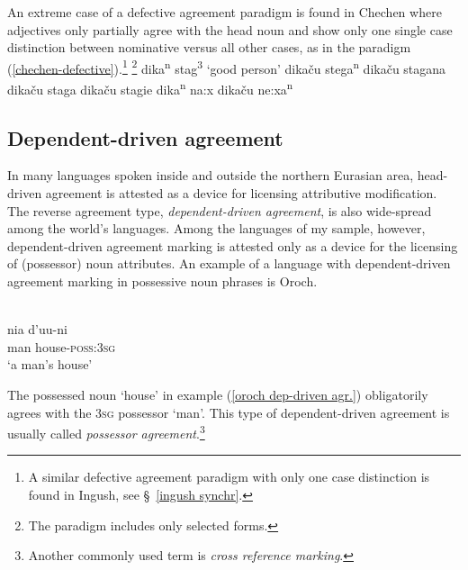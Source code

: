 An extreme case of a defective agreement paradigm is found in Chechen where adjectives only partially agree with the head noun and show only one single case distinction between nominative versus all other cases, as in the paradigm (\ref{chechen-defective}).\footnote{A similar defective agreement paradigm with only one case distinction is found in Ingush, see \S~\ref{ingush synchr}.}
\ea
\label{chechen-defective}
\footnote{The paradigm includes only selected forms.}
\ea dika\textsuperscript{n} stag\textsuperscript{3} \rm{‘good person’}		
\ex dikaču stega\textsuperscript{n} 								
\ex dikaču stagana 											
\ex dikaču staga 											
\ex dikaču stagie											
\ex dika\textsuperscript{n} na:x									
\ex dikaču ne:xa\textsuperscript{n}								
\zl
{}

\subsection{Dependent-driven agreement}
In many languages spoken inside and outside the northern Eurasian area, head\hyp{}driven agreement is attested as a device for licensing attributive modification. The reverse agreement type, \emph{dependent-driven agreement}, is also wide-spread among the world's languages. Among the languages of my sample, however, dependent-driven agreement marking is attested only as a device for the licensing of (possessor) noun attributes. An example of a language with dependent-driven agreement marking in possessive noun phrases is Oroch.
\begin{exe}
\ex
\label{oroch dep-driven agr.}
\\
\gll 	nia	d'uu-ni\\
	man	house-\textsc{poss:3sg}\\
\glt	‘a man's house’
\end{exe}
The possessed noun ‘house’ in example (\ref{oroch dep-driven agr.}) obligatorily agrees with the \textsc{3sg} possessor ‘man’. This type of dependent-driven agreement is usually called \emph{possessor agreement}.\footnote{Another commonly used term is \emph{cross reference marking}.}


